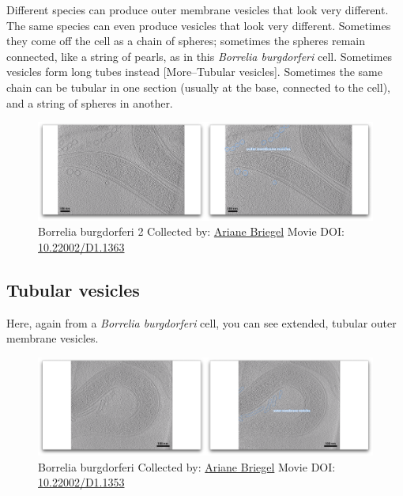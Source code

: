 \documentclass[]{tufte-book}
\begin{document}
Different species can produce outer membrane vesicles that look very
different. The same species can even produce vesicles that look very
different. Sometimes they come off the cell as a chain of spheres;
sometimes the spheres remain connected, like a string of pearls, as in
this \emph{Borrelia burgdorferi} cell. Sometimes vesicles form long
tubes instead {[}More--Tubular vesicles{]}. Sometimes the same chain can
be tubular in one section (usually at the base, connected to the cell),
and a string of spheres in another.





\begin{figure}
\includegraphics{movie_stills/2_4a} \caption[Borrelia burgdorferi 2 Collected by:
\protect\hyperlink{ariane_briegel}{Ariane Briegel} Movie DOI:
\href{https://doi.org/10.22002/D1.1363}{10.22002/D1.1363}]{Borrelia burgdorferi 2 Collected by:
\protect\hyperlink{ariane_briegel}{Ariane Briegel} Movie DOI:
\href{https://doi.org/10.22002/D1.1363}{10.22002/D1.1363}}\label{fig:2-4a}
\end{figure}

\hypertarget{Tubular_vesicles}{\subsection{Tubular
vesicles}\label{Tubular_vesicles}}

Here, again from a \emph{Borrelia burgdorferi} cell, you can see
extended, tubular outer membrane vesicles.





\begin{figure}
\includegraphics{movie_stills/2_4b} \caption[Borrelia burgdorferi Collected by:
\protect\hyperlink{ariane_briegel}{Ariane Briegel} Movie DOI:
\href{https://doi.org/10.22002/D1.1353}{10.22002/D1.1353}]{Borrelia burgdorferi Collected by:
\protect\hyperlink{ariane_briegel}{Ariane Briegel} Movie DOI:
\href{https://doi.org/10.22002/D1.1353}{10.22002/D1.1353}}\label{fig:2-4b}
\end{figure}
\end{document}
